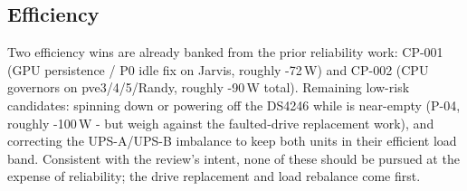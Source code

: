 \subsection{Efficiency}

Two efficiency wins are already banked from the prior reliability work: CP-001 (GPU
persistence / P0 idle fix on Jarvis, roughly -72\,W) and CP-002 (CPU governors on
pve3/4/5/Randy, roughly -90\,W total). Remaining low-risk candidates: spinning down or
powering off the DS4246 while  is near-empty (P-04, roughly -100\,W - but weigh
against the faulted-drive replacement work), and correcting the UPS-A/UPS-B imbalance to keep
both units in their efficient load band. Consistent with the review's intent, none of these
should be pursued at the expense of reliability; the drive replacement and load rebalance come
first.

